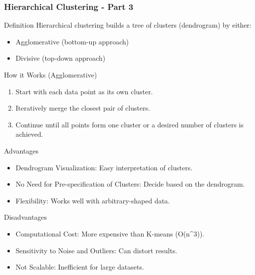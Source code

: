 \documentclass[aspectratio=169]{beamer}
\begin{document}
\begin{frame}[fragile]
    \frametitle{Hierarchical Clustering - Part 3}
    \begin{block}{Definition}
        Hierarchical clustering builds a tree of clusters (dendrogram) by either:
        \begin{itemize}
            \item Agglomerative (bottom-up approach)
            \item Divisive (top-down approach)
        \end{itemize}
    \end{block}
    
    \begin{block}{How it Works (Agglomerative)}
        \begin{enumerate}
            \item Start with each data point as its own cluster.
            \item Iteratively merge the closest pair of clusters.
            \item Continue until all points form one cluster or a desired number of clusters is achieved.
        \end{enumerate}
    \end{block}

    \begin{block}{Advantages}
        \begin{itemize}
            \item Dendrogram Visualization: Easy interpretation of clusters.
            \item No Need for Pre-specification of Clusters: Decide based on the dendrogram.
            \item Flexibility: Works well with arbitrary-shaped data.
        \end{itemize}
    \end{block}
    
    \begin{block}{Disadvantages}
        \begin{itemize}
            \item Computational Cost: More expensive than K-means (O(n^3)).
            \item Sensitivity to Noise and Outliers: Can distort results.
            \item Not Scalable: Inefficient for large datasets.
        \end{itemize}
    \end{block}
\end{frame}
\end{document}
